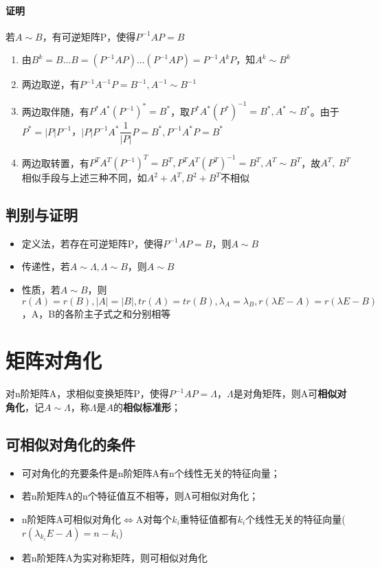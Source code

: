 \paragraph{证明}
若\(A \sim B\)，有可逆矩阵P，使得\(P^{-1}AP = B\)
\begin{enumerate}
    \item 由\(B^k = B...B = (P^{-1}AP)...(P^{-1}AP) = P^{-1}A^kP\)，知\(A^k \sim B^k\)
    \item 两边取逆，有\(P^{-1}A^{-1}P = B^{-1}, A^{-1} \sim B^{-1}\)
    \item 两边取伴随，有\(P^*A^*(P^{-1})^* = B^*\)，取\(P^*A^*(P^*)^{-1} = B^*, A^* \sim B^*\)。由于\(P^* = |P|P^{-1}\)，\(|P|P^{-1}A^*\dfrac{1}{|P|}P = B^*, P^{-1}A^*P = B^*\)
    \item 两边取转置，有\(P^TA^T(P^{-1})^T = B^T, P^TA^T(P^T)^{-1} = B^T, A^T \sim B^T\)，故\(A^T,\ B^T\)相似手段与上述三种不同，如\(A^2 + A^T, B^2 + B^T\)不相似
\end{enumerate}


\subsection{判别与证明}
\begin{itemize}
    \item 定义法，若存在可逆矩阵P，使得\(P^{-1}AP = B\)，则\(A \sim B\)
    \item 传递性，若\(A \sim \Lambda, \Lambda \sim B\)，则\(A \sim B\)
    \item 性质，若\(A \sim B\)，则\(r(A) = r(B), |A| = |B|, tr(A) = tr(B), \lambda_A = \lambda_B, r(\lambda E - A) = r(\lambda E - B)\)，A，B的各阶主子式之和分别相等
\end{itemize}


\section{矩阵对角化}
对n阶矩阵A，求相似变换矩阵P，使得\(P^{-1}AP = \Lambda\)，\(\Lambda\)是对角矩阵，则A可\textbf{相似对角化}，记\(A \sim \Lambda\)，称\(\Lambda\)是\(A\)的\textbf{相似标准形}；

\subsection{可相似对角化的条件}
\begin{itemize}
    \item 可对角化的充要条件是n阶矩阵A有n个线性无关的特征向量；
    \item 若n阶矩阵A的n个特征值互不相等，则A可相似对角化；
    \item n阶矩阵A可相似对角化\(\Leftrightarrow\)A对每个\(k_i\)重特征值都有\(k_i\)个线性无关的特征向量(\(r(\lambda_{k_i}E - A) = n - k_i\))
    \item 若n阶矩阵A为实对称矩阵，则可相似对角化
\end{itemize}


